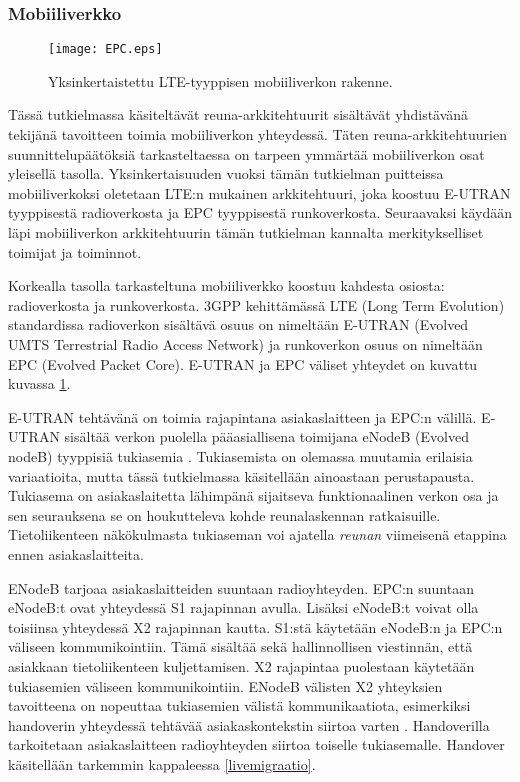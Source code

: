 \subsubsection{Mobiiliverkko}
\begin{figure}[tb]
\texttt{[image: EPC.eps]}
\caption{Yksinkertaistettu LTE-tyyppisen mobiiliverkon rakenne.} \label{fig:mobiarch}
\end{figure}

Tässä tutkielmassa käsiteltävät reuna-arkkitehtuurit sisältävät yhdistävänä tekijänä tavoitteen toimia mobiiliverkon yhteydessä. 
Täten reuna-arkkitehtuurien suunnittelupäätöksiä tarkasteltaessa on tarpeen ymmärtää mobiiliverkon osat yleisellä tasolla.
Yksinkertaisuuden vuoksi tämän tutkielman puitteissa mobiiliverkoksi oletetaan LTE:n mukainen arkkitehtuuri, joka koostuu E-UTRAN tyyppisestä radioverkosta ja EPC tyyppisestä runkoverkosta.
Seuraavaksi käydään läpi mobiiliverkon arkkitehtuurin tämän tutkielman kannalta merkitykselliset toimijat ja toiminnot.

Korkealla tasolla tarkasteltuna mobiiliverkko koostuu kahdesta osiosta: radioverkosta ja runkoverkosta. 3GPP kehittämässä LTE (Long Term Evolution) standardissa radioverkon sisältävä osuus on nimeltään E-UTRAN (Evolved UMTS Terrestrial Radio Access Network) ja runkoverkon osuus on nimeltään EPC (Evolved Packet Core).
E-UTRAN ja EPC väliset yhteydet on kuvattu kuvassa \ref{fig:mobiarch}.

E-UTRAN tehtävänä on toimia rajapintana asiakaslaitteen ja EPC:n välillä. 
E-UTRAN sisältää verkon puolella pääasiallisena toimijana eNodeB (Evolved nodeB) tyyppisiä tukiasemia \cite{etsieutran}.
Tukiasemista on olemassa muutamia erilaisia variaatioita, mutta tässä tutkielmassa käsitellään ainoastaan perustapausta.
Tukiasema on asiakaslaitetta lähimpänä sijaitseva funktionaalinen verkon osa ja sen seurauksena se on houkutteleva kohde reunalaskennan ratkaisuille. Tietoliikenteen näkökulmasta tukiaseman voi ajatella \textit{reunan} viimeisenä etappina ennen asiakaslaitteita. 

ENodeB tarjoaa asiakaslaitteiden suuntaan radioyhteyden.
EPC:n suuntaan eNodeB:t ovat yhteydessä S1 rajapinnan avulla.
Lisäksi eNodeB:t voivat olla toisiinsa yhteydessä X2 rajapinnan kautta.
S1:stä käytetään eNodeB:n ja EPC:n väliseen kommunikointiin. Tämä sisältää sekä hallinnollisen viestinnän, että asiakkaan tietoliikenteen kuljettamisen.
X2 rajapintaa puolestaan käytetään tukiasemien väliseen kommunikointiin. 
ENodeB välisten X2 yhteyksien tavoitteena on nopeuttaa tukiasemien välistä kommunikaatiota, esimerkiksi handoverin yhteydessä tehtävää asiakaskontekstin siirtoa varten \cite{3gpplte}.
Handoverilla tarkoitetaan asiakaslaitteen radioyhteyden siirtoa toiselle tukiasemalle. Handover käsitellään tarkemmin kappaleessa \ref{livemigraatio}.

